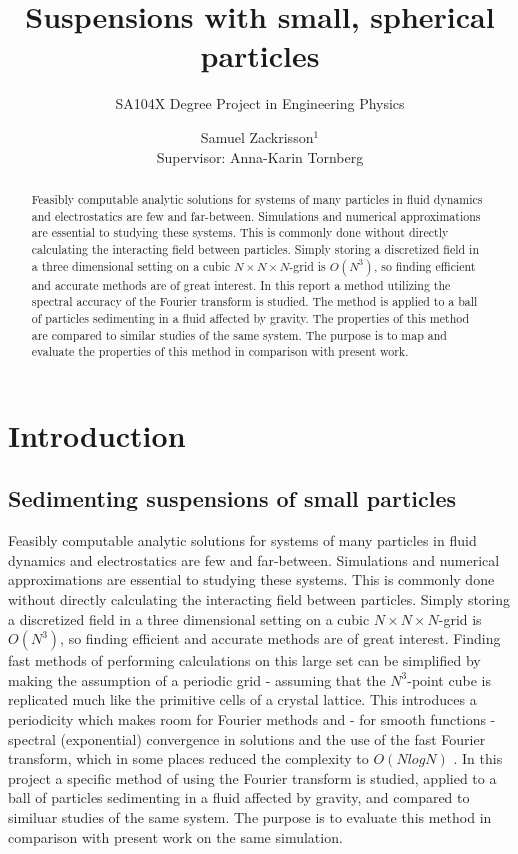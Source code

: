 \documentclass[a4paper,
twoside=false,abstract=false,numbers=noenddot,
titlepage=false,headings=small,parskip=half,version=last]{scrartcl}
\title{Suspensions with small, spherical particles}
\subtitle{SA104X Degree Project in Engineering Physics}
\author[2]{Samuel Zackrisson$^1$ \\ \footnotesize Supervisor: Anna-Karin Tornberg}
\affil[2]{Numerical Analysis, Royal Institute of Technology (KTH)}
\affil[1]{samuelz@kth.se}
\affil[2]{akto@kth.se}
\begin{document}
\maketitle
\thispagestyle{empty}

\begin{abstract}
Feasibly computable analytic solutions for systems of many particles in fluid dynamics and electrostatics are few and far-between.
Simulations and numerical approximations are essential to studying these systems.
This is commonly done without directly calculating the interacting field between particles.
Simply storing a discretized field in a three dimensional setting on a cubic $N\times N\times N$-grid is $O(N^3)$, so finding efficient and accurate methods are of great interest.
In this report a method utilizing the spectral accuracy of the Fourier transform is studied.
The method is applied to a ball of particles sedimenting in a fluid affected by gravity.
The properties of this method are compared to similar studies of the same system.
The purpose is to map and evaluate the properties of this method in comparison with present work.
\end{abstract}

\pagebreak

\tableofcontents

\pagebreak

\section{Introduction}
\subsection{Sedimenting suspensions of small particles}
Feasibly computable analytic solutions for systems of many particles in fluid dynamics and electrostatics are few and far-between.
Simulations and numerical approximations are essential to studying these systems.
This is commonly done without directly calculating the interacting field between particles.
Simply storing a discretized field in a three dimensional setting on a cubic $N\times N\times N$-grid is $O(N^3)$, so finding efficient and accurate methods are of great interest.
Finding fast methods of performing calculations on this large set can be simplified by making the assumption of a periodic grid - assuming that the $N^3$-point cube is replicated much like the primitive cells of a crystal lattice. This introduces a periodicity which makes room for Fourier methods and - for smooth functions - spectral (exponential) convergence in solutions and the use of the fast Fourier transform, which in some places reduced the complexity to $O(NlogN)$ \cite{fluctuatesediment}. In this project a specific method of using the Fourier transform is studied, applied to a ball of particles sedimenting in a fluid affected by gravity, and compared to similuar studies of the same system. The purpose is to evaluate this method in comparison with present work on the same simulation.
\end{document}
